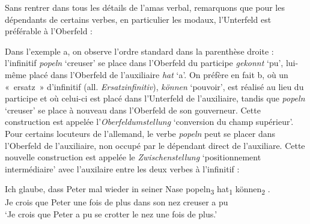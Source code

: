 {    Sans rentrer dans tous les détails de l’amas verbal, remarquons que pour les dépendants de certains verbes, en particulier les modaux, l’Unterfeld est préférable à l’Oberfeld :

    \ea\label{ex:konnen}
    \z
    \z

    Dans l’exemple a, on observe l’ordre standard dans la parenthèse droite : l’infinitif \textit{popeln} ‘creuser’ se place dans l’Oberfeld du participe \textit{gekonnt} ‘pu’, lui-même placé dans l’Oberfeld de l’auxiliaire \textit{hat} ‘a’. On préfère en fait b, où un «~ersatz~» d’infinitif (all. \textit{Ersatzinfinitiv}), \textit{können} ‘pouvoir’, est réalisé au lieu du participe et où celui-ci est placé dans l’Unterfeld de l’auxiliaire, tandis que \textit{popeln} ‘creuser’ se place à nouveau dans l’Oberfeld de son gouverneur. Cette construction est appelée l’\textit{Oberfeldumstellung} ‘conversion du champ supérieur’. Pour certains locuteurs de l’allemand, le verbe \textit{popeln} peut se placer dans l’Oberfeld de l’auxiliaire, non occupé par le dépendant direct de l’auxiliare. Cette nouvelle construction est appelée le \textit{Zwischenstellung} ‘positionnement intermédiaire’ avec l’auxilaire entre les deux verbes à l’infinitif :

    \begin{exe}
    \begin{xlist}
     \gll Ich glaube,  {\ob} dass Peter {mal wieder} in seiner Nase  {popeln\textsubscript{3}} {hat\textsubscript{1}} {können\textsubscript{2}} {\cb}.\\
    Je crois   {\ob} que   Peter {une fois de plus} dans son nez  creuser  a     pu {\cb}\\
    \glt ‘Je crois que Peter a pu se crotter le nez {une fois de plus}.’
    \end{xlist}
    \end{exe}
}
